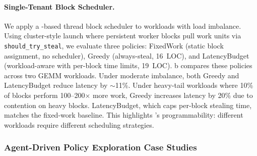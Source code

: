 \paragraph{Single-Tenant Block Scheduler.}
We apply a \sys-based thread block scheduler to workloads with load imbalance.
Using cluster-style launch where persistent worker blocks pull work units via \texttt{should\_\allowbreak{}try\_steal}, we evaluate three policies: FixedWork (static block assignment, no scheduler), Greedy (always-steal, 16~LOC), and LatencyBudget (workload-aware with per-block time limits, 19~LOC).
b compares these policies across two GEMM workloads.
Under moderate imbalance, both Greedy and LatencyBudget reduce latency by $\sim$11\%.
Under heavy-tail workloads where 10\% of blocks perform 100--200$\times$ more work, Greedy increases latency by 20\% due to contention on heavy blocks.
LatencyBudget, which caps per-block stealing time, matches the fixed-work baseline.
This highlights \sys's programmability: different workloads require different scheduling strategies.

\subsubsection{Agent-Driven Policy Exploration Case Studies}
\label{sec:rq1-agent}

